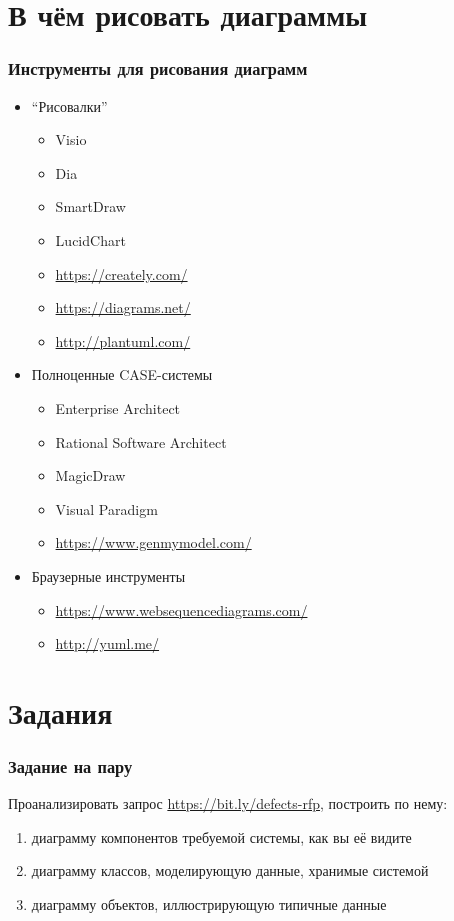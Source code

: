 \documentclass{../cscslides}
\begin{document}
    
    \frame{\titlepage}

    \section{В чём рисовать диаграммы}

    \begin{frame}
        \frametitle{Инструменты для рисования диаграмм}
        \begin{itemize}
            \item ``Рисовалки''
            \begin{itemize}
                \item Visio
                \item Dia
                \item SmartDraw
                \item LucidChart
                \item \url{https://creately.com/}
                \item \url{https://diagrams.net/}
                \item \url{http://plantuml.com/}
            \end{itemize}
            \item Полноценные CASE-системы
            \begin{itemize}
                \item Enterprise Architect
                \item Rational Software Architect
                \item MagicDraw
                \item Visual Paradigm
                \item \url{https://www.genmymodel.com/}
            \end{itemize}
            \item Браузерные инструменты
            \begin{itemize}
                \item \url{https://www.websequencediagrams.com/}
                \item \url{http://yuml.me/}
            \end{itemize}
        \end{itemize}
    \end{frame}

    \section{Задания}

    \begin{frame}
        \frametitle{Задание на пару}
        Проанализировать запрос \url{https://bit.ly/defects-rfp}, построить по нему:
        \begin{enumerate}
            \item диаграмму компонентов требуемой системы, как вы её видите
            \item диаграмму классов, моделирующую данные, хранимые системой
            \item диаграмму объектов, иллюстрирующую типичные данные
        \end{enumerate}
    \end{frame}
\end{document}
